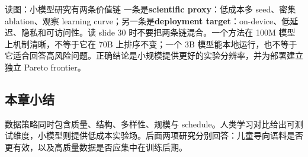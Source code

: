 
\begin{knowledgebox}{读图：小模型研究有两条价值链}
一条是\textbf{scientific proxy}：低成本多 seed、密集 ablation、观察 learning curve；另一条是\textbf{deployment target}：on-device、低延迟、隐私和可访问性。读 slide 30 时不要把两条链混合。一个方法在 100M 模型上机制清晰，不等于它在 70B 上排序不变；一个 3B 模型能本地运行，也不等于它适合回答高风险问题。正确结论是小规模提供更好的实验分辨率，并为部署建立独立 Pareto frontier。
\end{knowledgebox}


\subsection{本章小结}

数据策略同时包含质量、结构、多样性、规模与 schedule。人类学习对比给出可测试维度，小模型则提供低成本实验场。后面两项研究分别回答：儿童导向语料是否更有效，以及高质量数据是否应集中在训练后期。

